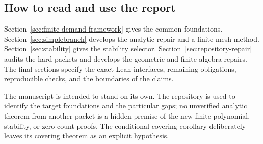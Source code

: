 \subsection{How to read and use the report}

Section~\ref{sec:finite-demand-framework} gives the common foundations.
Section~\ref{sec:simplebranch} develops the analytic repair and a finite
mesh method. Section~\ref{sec:stability} gives the stability selector.
Section~\ref{sec:repository-repair} audits the hard packets and develops
the geometric and finite algebra repairs. The final sections specify
the exact Lean interfaces, remaining obligations, reproducible checks,
and the boundaries of the claims.

The manuscript is intended to stand on its own. The repository is used
to identify the target foundations and the particular gaps; no unverified
analytic theorem from another packet is a hidden premise of the new
finite polynomial, stability, or zero-count proofs. The conditional
covering corollary deliberately leaves its covering theorem as an
explicit hypothesis.
